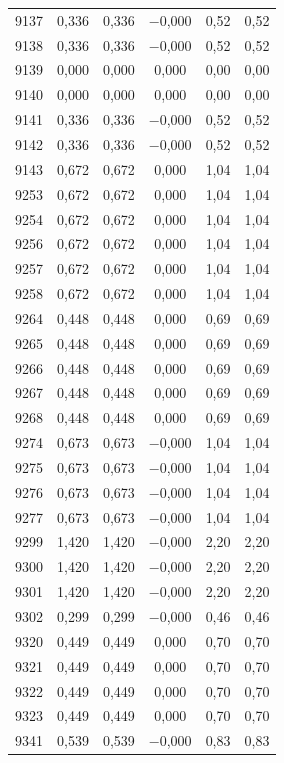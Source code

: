 \begin{longtable}{lccccc}
9137 & 0,336 & 0,336 & $-$0,000 & 0,52 & 0,52 \\
9138 & 0,336 & 0,336 & $-$0,000 & 0,52 & 0,52 \\
9139 & 0,000 & 0,000 & 0,000 & 0,00 & 0,00 \\
9140 & 0,000 & 0,000 & 0,000 & 0,00 & 0,00 \\
9141 & 0,336 & 0,336 & $-$0,000 & 0,52 & 0,52 \\
9142 & 0,336 & 0,336 & $-$0,000 & 0,52 & 0,52 \\
9143 & 0,672 & 0,672 & 0,000 & 1,04 & 1,04 \\
9253 & 0,672 & 0,672 & 0,000 & 1,04 & 1,04 \\
9254 & 0,672 & 0,672 & 0,000 & 1,04 & 1,04 \\
9256 & 0,672 & 0,672 & 0,000 & 1,04 & 1,04 \\
9257 & 0,672 & 0,672 & 0,000 & 1,04 & 1,04 \\
9258 & 0,672 & 0,672 & 0,000 & 1,04 & 1,04 \\
9264 & 0,448 & 0,448 & 0,000 & 0,69 & 0,69 \\
9265 & 0,448 & 0,448 & 0,000 & 0,69 & 0,69 \\
9266 & 0,448 & 0,448 & 0,000 & 0,69 & 0,69 \\
9267 & 0,448 & 0,448 & 0,000 & 0,69 & 0,69 \\
9268 & 0,448 & 0,448 & 0,000 & 0,69 & 0,69 \\
9274 & 0,673 & 0,673 & $-$0,000 & 1,04 & 1,04 \\
9275 & 0,673 & 0,673 & $-$0,000 & 1,04 & 1,04 \\
9276 & 0,673 & 0,673 & $-$0,000 & 1,04 & 1,04 \\
9277 & 0,673 & 0,673 & $-$0,000 & 1,04 & 1,04 \\
9299 & 1,420 & 1,420 & $-$0,000 & 2,20 & 2,20 \\
9300 & 1,420 & 1,420 & $-$0,000 & 2,20 & 2,20 \\
9301 & 1,420 & 1,420 & $-$0,000 & 2,20 & 2,20 \\
9302 & 0,299 & 0,299 & $-$0,000 & 0,46 & 0,46 \\
9320 & 0,449 & 0,449 & 0,000 & 0,70 & 0,70 \\
9321 & 0,449 & 0,449 & 0,000 & 0,70 & 0,70 \\
9322 & 0,449 & 0,449 & 0,000 & 0,70 & 0,70 \\
9323 & 0,449 & 0,449 & 0,000 & 0,70 & 0,70 \\
9341 & 0,539 & 0,539 & $-$0,000 & 0,83 & 0,83 \\

\end{longtable}
